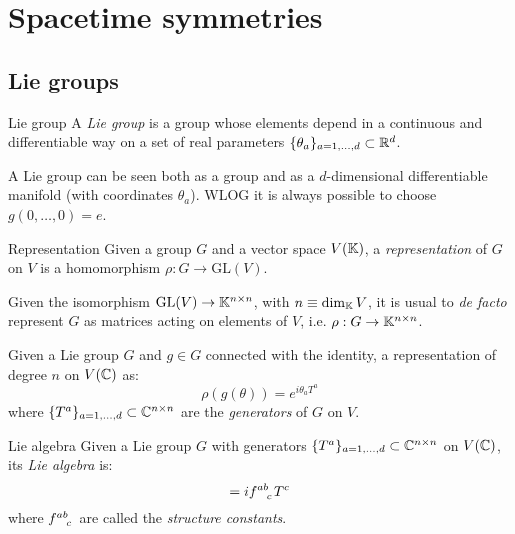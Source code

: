 \newpage

\section{Spacetime symmetries}

\subsection{Lie groups}

\begin{definition}{Lie group}{}
  A \textit{Lie group} is a group whose elements depend in a continuous and differentiable way on a set of real parameters $ \{\theta_a\}_{a = 1, \dots, d} \subset \mathbb{R}^d $.
\end{definition}

A Lie group can be seen both as a group and as a $ d $-dimensional differentiable manifold (with coordinates $ \theta_a $). WLOG it is always possible to choose $ g(0,\dots,0) = e $.

\begin{definition}{Representation}{}
  Given a group $ G $ and a vector space $ V(\mathbb{K}) $, a \textit{representation} of $ G $ on $ V $ is a homomorphism $ \rho : G \rightarrow \mathrm{GL}(V) $.
\end{definition}

Given the isomorphism $ \mathrm{GL}(V) \rightarrow \mathbb{K}^{n \times n} $, with $ n \equiv \dim_{\mathbb{K}} V $, it is usual to \textit{de facto} represent $ G $ as matrices acting on elements of $ V $, i.e. $ \rho : G \rightarrow \mathbb{K}^{n \times n} $.

\begin{theorem}{}{}
  Given a Lie group $ G $ and $ g \in G $ connected with the identity, a representation of degree $ n $ on $ V(\mathbb{C}) $ as:
  \begin{equation}
    \rho(g(\theta)) = e^{i \theta_a T^a}
    \label{eq:1.27}
  \end{equation}
  where $ \{T^a\}_{a = 1, \dots, d} \subset \mathbb{C}^{n \times n} $ are the \textit{generators} of $ G $ on $ V $.
\end{theorem}

\begin{definition}{Lie algebra}{}
  Given a Lie group $ G $ with generators $ \{T^a\}_{a = 1, \dots, d} \subset \mathbb{C}^{n \times n} $ on $ V(\mathbb{C}) $, its \textit{Lie algebra} is:
  \begin{equation}
    [T^a, T^b] = i \tensor{f}{^a^b_c} T^c
    \label{eq:1.28}
  \end{equation}
  where $ \tensor{f}{^a^b_c} $ are called the \textit{structure constants}.
\end{definition}

